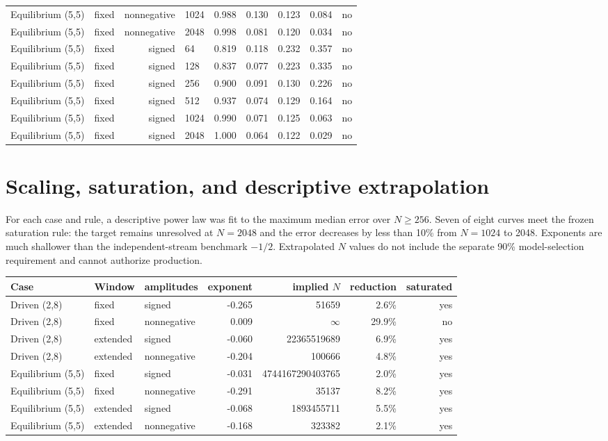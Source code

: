 \documentclass[10pt]{article}
\begin{document}
\begin{longtable}{llrlrrrrr}
Equilibrium (5,5) & fixed & nonnegative & 1024 & 0.988 & 0.130 & 0.123 & 0.084 & no \\
Equilibrium (5,5) & fixed & nonnegative & 2048 & 0.998 & 0.081 & 0.120 & 0.034 & no \\
Equilibrium (5,5) & fixed & signed & 64 & 0.819 & 0.118 & 0.232 & 0.357 & no \\
Equilibrium (5,5) & fixed & signed & 128 & 0.837 & 0.077 & 0.223 & 0.335 & no \\
Equilibrium (5,5) & fixed & signed & 256 & 0.900 & 0.091 & 0.130 & 0.226 & no \\
Equilibrium (5,5) & fixed & signed & 512 & 0.937 & 0.074 & 0.129 & 0.164 & no \\
Equilibrium (5,5) & fixed & signed & 1024 & 0.990 & 0.071 & 0.125 & 0.063 & no \\
Equilibrium (5,5) & fixed & signed & 2048 & 1.000 & 0.064 & 0.122 & 0.029 & no \\
\bottomrule\end{longtable}\normalsize
\section{Scaling, saturation, and descriptive extrapolation}
For each case and rule, a descriptive power law was fit to the maximum median error over $N\geq256$. Seven of eight curves meet the frozen saturation rule: the target remains unresolved at $N=2048$ and the error decreases by less than 10\% from $N=1024$ to 2048. Exponents are much shallower than the independent-stream benchmark $-1/2$. Extrapolated $N$ values do not include the separate 90\% model-selection requirement and cannot authorize production.
\small\begin{longtable}{lllrrrr}\toprule Case & Window & amplitudes & exponent & implied $N$ & reduction & saturated\\\midrule\endhead
Driven (2,8) & fixed & signed & -0.265 & 51659 & 2.6\% & yes \\
Driven (2,8) & fixed & nonnegative & 0.009 & $\infty$ & 29.9\% & no \\
Driven (2,8) & extended & signed & -0.060 & 22365519689 & 6.9\% & yes \\
Driven (2,8) & extended & nonnegative & -0.204 & 100666 & 4.8\% & yes \\
Equilibrium (5,5) & fixed & signed & -0.031 & 4744167290403765 & 2.0\% & yes \\
Equilibrium (5,5) & fixed & nonnegative & -0.291 & 35137 & 8.2\% & yes \\
Equilibrium (5,5) & extended & signed & -0.068 & 1893455711 & 5.5\% & yes \\
Equilibrium (5,5) & extended & nonnegative & -0.168 & 323382 & 2.1\% & yes \\
\bottomrule\end{longtable}\normalsize
\end{document}
